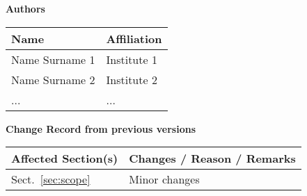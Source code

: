 \documentclass[12pt,a4paper]{article}
\begin{document}



\newpage
\pagestyle{fancy}

\noindent
{\Large \bf Authors}
\medskip

\noindent
\begin{tabularx}{\textwidth}{|l|X|}
  \hline
      {\bf Name} & {\bf Affiliation}\\
      \hline
      Name Surname 1     & Institute 1 \\ \hline
      Name Surname 2     & Institute 2 \\ \hline
      ...                & ...         \\ \hline
\end{tabularx}

\vspace{3cm}

\noindent
{\Large \bf Change Record from previous versions}
\medskip

\noindent
\begin{tabularx}{\textwidth}{|l|X|}
  \hline
      {\bf Affected Section(s)} & {\bf Changes / Reason / Remarks}\\  \hline
      Sect.~\ref{sec:scope}&  Minor changes \\ \hline
\end{tabularx}


\newpage





\newpage
\listofreq \thispagestyle{fancy}

\listofquestion \thispagestyle{fancy}


\label{LastPage}
\end{document}
